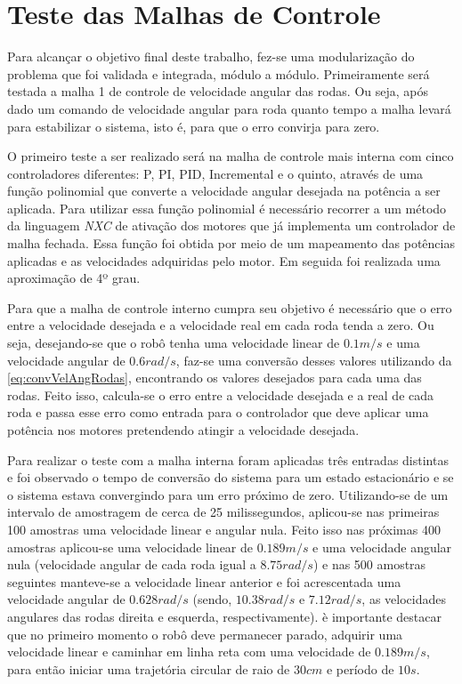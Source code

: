 \chapter{Teste das Malhas de Controle}
\label{chap:testesMalhas}
Para alcançar o objetivo final deste trabalho, fez-se uma modularização do problema que foi validada e integrada, módulo a módulo. Primeiramente será testada a malha 1 de controle de velocidade angular das rodas. Ou seja, após dado um comando de velocidade angular para roda quanto tempo a malha levará para estabilizar o sistema, isto é, para que o erro convirja para zero. 

O primeiro teste a ser realizado será na malha de controle mais interna com cinco controladores diferentes: P, PI, PID, Incremental e o quinto, através de uma função polinomial que converte a velocidade angular desejada na potência a ser aplicada. Para utilizar essa função polinomial é necessário recorrer a um método da linguagem \emph{NXC} de ativação dos motores que já implementa um controlador de malha fechada. Essa função foi obtida por meio de um mapeamento das potências aplicadas e as velocidades adquiridas pelo motor. Em seguida foi realizada uma aproximação de 4º grau. %

Para que a malha de controle interno cumpra seu objetivo é necessário que o erro entre a velocidade desejada e a velocidade real em cada roda tenda a zero. Ou seja, desejando-se que o robô tenha uma velocidade linear de $0.1 m/s$ e uma velocidade angular de $0.6 rad/s$, faz-se uma conversão desses valores utilizando da \autoref{eq:convVelAngRodas}, encontrando os valores desejados para cada uma das rodas. Feito isso, calcula-se o erro entre a velocidade desejada e a real de cada roda e passa esse erro como entrada para o controlador que deve aplicar uma potência nos motores pretendendo atingir a velocidade desejada.

Para realizar o teste com a malha interna foram aplicadas três entradas distintas e foi observado o tempo de conversão do sistema para um estado estacionário e se o sistema estava convergindo para um erro próximo de zero. Utilizando-se de um intervalo de amostragem de cerca de 25 milissegundos, aplicou-se nas primeiras 100 amostras uma velocidade linear e angular nula. Feito isso nas próximas 400 amostras aplicou-se uma velocidade linear de $0.189 m/s$ e uma velocidade angular nula (velocidade angular de cada roda igual a $8.75 rad/s$) e nas 500 amostras seguintes manteve-se a velocidade linear anterior e foi acrescentada uma velocidade angular de $0.628 rad/s$ (sendo, $10.38 rad/s$ e $7.12 rad/s$, as velocidades angulares das rodas direita e esquerda, respectivamente). è importante destacar que no primeiro momento o robô deve permanecer parado, adquirir uma velocidade linear e caminhar em linha reta com uma velocidade de $0.189 m/s$, para então iniciar uma trajetória circular de raio de $30 cm$ e período de $10 s$.

